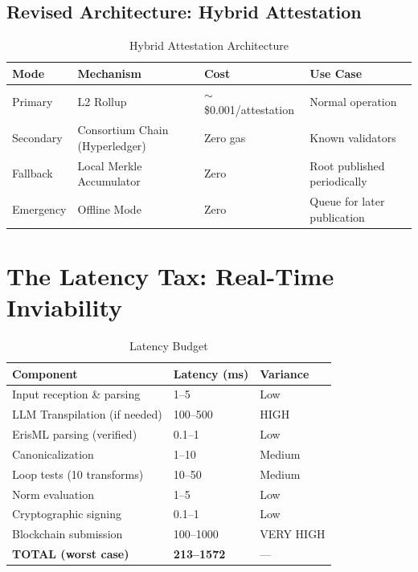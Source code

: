 \documentclass[11pt,letterpaper]{article}
\theoremstyle{definition}
\theoremstyle{remark}
\begin{document}
\subsection{Revised Architecture: Hybrid Attestation}

\begin{table}[h]
\centering
\begin{tabular}{@{}llll@{}}
\toprule
\textbf{Mode} & \textbf{Mechanism} & \textbf{Cost} & \textbf{Use Case} \\
\midrule
Primary & L2 Rollup & $\sim$\$0.001/attestation & Normal operation \\
Secondary & Consortium Chain (Hyperledger) & Zero gas & Known validators \\
Fallback & Local Merkle Accumulator & Zero & Root published periodically \\
Emergency & Offline Mode & Zero & Queue for later publication \\
\bottomrule
\end{tabular}
\caption{Hybrid Attestation Architecture}
\end{table}


\section{The Latency Tax: Real-Time Inviability}

\begin{table}[h]
\centering
\begin{tabular}{@{}lll@{}}
\toprule
\textbf{Component} & \textbf{Latency (ms)} & \textbf{Variance} \\
\midrule
Input reception \& parsing & 1--5 & Low \\
LLM Transpilation (if needed) & 100--500 & HIGH \\
ErisML parsing (verified) & 0.1--1 & Low \\
Canonicalization & 1--10 & Medium \\
Loop tests (10 transforms) & 10--50 & Medium \\
Norm evaluation & 1--5 & Low \\
Cryptographic signing & 0.1--1 & Low \\
Blockchain submission & 100--1000 & VERY HIGH \\
\textbf{TOTAL (worst case)} & \textbf{213--1572} & --- \\
\bottomrule
\end{tabular}
\caption{Latency Budget}
\end{table}
\end{document}
